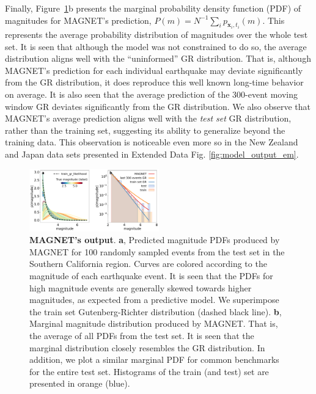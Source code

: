 \documentclass[pdflatex]{sn-jnl}
\begin{document}
Finally, Figure~\ref{fig:model_output}b presents the marginal probability density function (PDF) of magnitudes for MAGNET's prediction, $P(m)=N^{-1}\sum_i p_{\textbf{x}_i, t_i}(m)$. This represents the average probability distribution of magnitudes over the whole test set. It is seen that although the model was not constrained to do so, the average distribution aligns well with the ``uninformed'' GR distribution. That is, although MAGNET's prediction for each individual earthquake may deviate significantly from the GR distribution, it does reproduce this well known long-time behavior on average. It is also seen that the average prediction of the 300-event moving window GR deviates significantly from the GR distribution. We also observe that MAGNET's average prediction aligns well with the \emph{test set} GR distribution, rather than the training set, suggesting its ability to generalize beyond the training data. This observation is noticeable even more so in the New Zealand and Japan data sets presented in Extended Data Fig. \ref{fig:model_output_em}.

\begin{figure}[h!]
    \centering
    \includegraphics[width=0.5\textwidth]{figures/raw_results.pdf}
    \caption{
        \textbf{MAGNET's output}. \textbf{a}, Predicted magnitude PDFs produced by MAGNET for 100 randomly sampled events from the test set in the Southern California region. Curves are colored according to the magnitude of each earthquake event. It is seen that the PDFs for high magnitude events are generally skewed towards higher magnitudes, as expected from a predictive model. We superimpose the train set Gutenberg-Richter distribution (dashed black line).  \textbf{b}, Marginal magnitude distribution produced by MAGNET. That is, the average of all PDFs from the test set. It is seen that the marginal distribution closely resembles the GR distribution. In addition, we plot a similar marginal PDF for common benchmarks for the entire test set. Histograms of the train (and test) set are presented in orange (blue).
    }
    \label{fig:model_output}
\end{figure}
\end{document}
